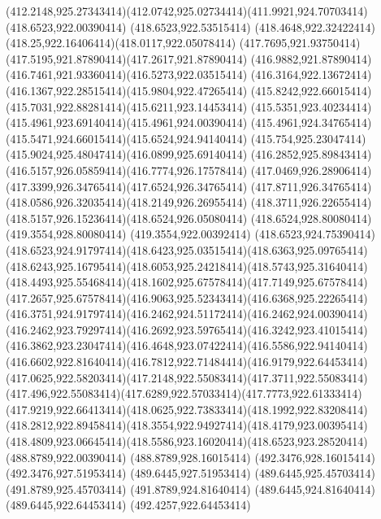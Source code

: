 {{	\curveto(412.2148,925.27343414)(412.0742,925.02734414)(411.9921,924.70703414)
	\closepath
	\moveto(418.6523,922.00390414)
	\lineto(418.6523,922.53515414)
	\curveto(418.4648,922.32422414)(418.25,922.16406414)(418.0117,922.05078414)
	\curveto(417.7695,921.93750414)(417.5195,921.87890414)(417.2617,921.87890414)
	\curveto(416.9882,921.87890414)(416.7461,921.93360414)(416.5273,922.03515414)
	\curveto(416.3164,922.13672414)(416.1367,922.28515414)(415.9804,922.47265414)
	\curveto(415.8242,922.66015414)(415.7031,922.88281414)(415.6211,923.14453414)
	\curveto(415.5351,923.40234414)(415.4961,923.69140414)(415.4961,924.00390414)
	\curveto(415.4961,924.34765414)(415.5471,924.66015414)(415.6524,924.94140414)
	\curveto(415.754,925.23047414)(415.9024,925.48047414)(416.0899,925.69140414)
	\curveto(416.2852,925.89843414)(416.5157,926.05859414)(416.7774,926.17578414)
	\curveto(417.0469,926.28906414)(417.3399,926.34765414)(417.6524,926.34765414)
	\curveto(417.8711,926.34765414)(418.0586,926.32035414)(418.2149,926.26955414)
	\curveto(418.3711,926.22655414)(418.5157,926.15236414)(418.6524,926.05080414)
	\lineto(418.6524,928.80080414)
	\lineto(419.3554,928.80080414)
	\lineto(419.3554,922.00392414)
	\closepath
	\moveto(418.6523,924.75390414)
	\curveto(418.6523,924.91797414)(418.6423,925.03515414)(418.6363,925.09765414)
	\curveto(418.6243,925.16795414)(418.6053,925.24218414)(418.5743,925.31640414)
	\curveto(418.4493,925.55468414)(418.1602,925.67578414)(417.7149,925.67578414)
	\curveto(417.2657,925.67578414)(416.9063,925.52343414)(416.6368,925.22265414)
	\curveto(416.3751,924.91797414)(416.2462,924.51172414)(416.2462,924.00390414)
	\curveto(416.2462,923.79297414)(416.2692,923.59765414)(416.3242,923.41015414)
	\curveto(416.3862,923.23047414)(416.4648,923.07422414)(416.5586,922.94140414)
	\curveto(416.6602,922.81640414)(416.7812,922.71484414)(416.9179,922.64453414)
	\curveto(417.0625,922.58203414)(417.2148,922.55083414)(417.3711,922.55083414)
	\curveto(417.496,922.55083414)(417.6289,922.57033414)(417.7773,922.61333414)
	\curveto(417.9219,922.66413414)(418.0625,922.73833414)(418.1992,922.83208414)
	\curveto(418.2812,922.89458414)(418.3554,922.94927414)(418.4179,923.00395414)
	\curveto(418.4809,923.06645414)(418.5586,923.16020414)(418.6523,923.28520414)
	\closepath
	\moveto(488.8789,922.00390414)
	\lineto(488.8789,928.16015414)
	\lineto(492.3476,928.16015414)
	\lineto(492.3476,927.51953414)
	\lineto(489.6445,927.51953414)
	\lineto(489.6445,925.45703414)
	\lineto(491.8789,925.45703414)
	\lineto(491.8789,924.81640414)
	\lineto(489.6445,924.81640414)
	\lineto(489.6445,922.64453414)
	\lineto(492.4257,922.64453414)
}}
